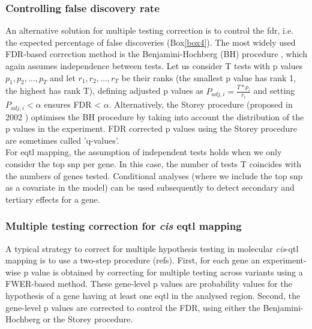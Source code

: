 \subsubsection{Controlling false discovery rate}

An alternative solution for multiple testing correction is to control the \gls{fdr}, i.e. the expected percentage of false discoveries (Box\ref{box4}).
The most widely used FDR-based correction method is the Benjamini-Hochberg (BH) procedure \cite{benjamini1995controlling}, which again assumes independence between tests. 
Let us consider T tests with p values $p_1, p_2, ..., p_T$ and let $r_1, r_2, ..., r_T$ be their ranks (the smallest p value has rank 1, the highest has rank T), defining adjusted p values as $P_{adj,i} = \frac{T*p_i}{r_i} $ and setting $P_{adj,i} <\alpha$ ensures FDR < $\alpha$.
Alternatively, the Storey procedure (proposed in 2002 \cite{storey2002direct}) optimises the BH procedure by taking into account the distribution of the p values in the experiment.
FDR corrected p values using the Storey procedure are sometimes called 'q-values'.\\


For e\gls{qtl} mapping, the assumption of independent tests holds when we only consider the top \gls{snp} per gene.
In this case, the number of tests T coincides with the numbers of genes tested.
Conditional analyses (where we include the top \gls{snp} as a covariate in the model) can be used subsequently to detect secondary and tertiary effects for a gene.

\subsubsection{Multiple testing correction for \textit{cis} e\gls{qtl} mapping}

A typical strategy to correct for multiple hypothesis testing in molecular \textit{cis}-\gls{qtl} mapping is to use a two-step procedure \cite{gtex2015genotype} (refs). 
First, for each gene an experiment-wise p value is obtained by correcting for multiple testing across variants using a FWER-based method. 
These gene-level p values are probability values for the hypothesis of a gene having at least
one e\gls{qtl} in the analysed region. 
Second, the gene-level p values are corrected to control the FDR, using either the Benjamini-Hochberg or the Storey procedure.\\


